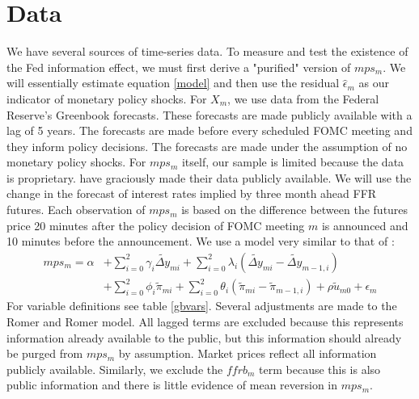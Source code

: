 \documentclass[a4paper,man,floatsintext,natbib]{apa6}
\begin{document}
	\section{Data}
	We have several sources of time-series data. To measure and test the existence of the Fed information effect, we must first derive a "purified" version of \(mps_m\). We will essentially estimate equation \ref{model} and then use the residual \(\hat{\epsilon}_m\) as our indicator of monetary policy shocks. For \(X_m\), we use data from the Federal Reserve's Greenbook forecasts. These forecasts are made publicly available with a lag of 5 years. The forecasts are made before every scheduled FOMC meeting and they inform policy decisions. The forecasts are made under the assumption of no monetary policy shocks. For \(mps_m\) itself, our sample is limited because the data is proprietary. \cite{Gertler2015} have graciously made their data publicly available. We will use the change in the forecast of interest rates implied by three month ahead FFR futures. Each observation of \(mps_m\) is based on the difference between the futures price 20 minutes after the policy decision of FOMC meeting \(m\) is announced and 10 minutes before the announcement. We use a model very similar to that of \cite{Romer2004}:
	\begin{align*}
		mps_m =  \alpha &+ \sum_{i=0}^{2} \gamma_i \widetilde{\Delta y}_{mi} + \sum^2_{i=0} \lambda_i \left(\widetilde{\Delta y}_{mi}-\widetilde{\Delta y}_{m-1,i}\right) \tag{4} \label{ep_hat_model} \\
		&+\sum^{2}_{i=0} \phi_i \tilde{\pi}_{mi} + \sum^2_{i=0} \theta_i \left(\tilde{ \pi}_{mi}-\tilde{ \pi}_{m-1,i}\right) + \rho \tilde{u}_{m0} + \epsilon_m
	\end{align*}
	For variable definitions see table \ref{gbvars}. Several adjustments are made to the Romer and Romer model. All lagged terms are excluded because this represents information already available to the public, but this information should already be purged from \(mps_m\) by assumption. Market prices reflect all information publicly available. Similarly, we exclude the \(ffrb_m\) term because this is also public information and there is little evidence of mean reversion in \(mps_m\). 
\end{document}
